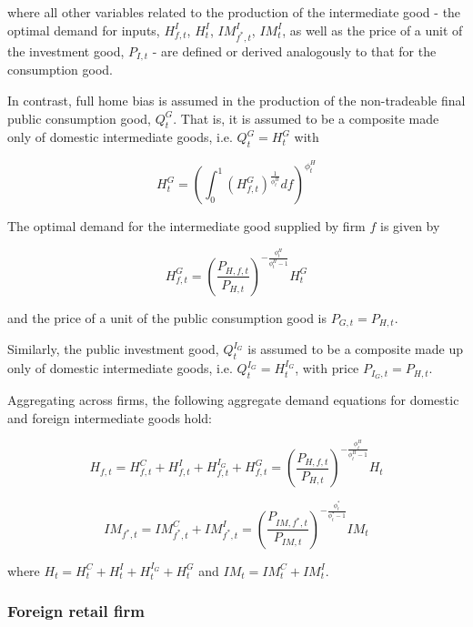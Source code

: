 \documentclass[a4paper,11pt]{article}
\numberwithin{equation}{section}
\begin{document}
	where all other variables related to the production of the intermediate good - the optimal demand for inputs, $H_{f,t}^I$, $H_t^I$, $IM_{f^*,t}^I$, $IM_t^I$, as well as the price of a unit of the investment good, $P_{I,t}$ - are defined or derived analogously to that for the consumption good.
	
	In contrast, full home bias is assumed in the production of the non-tradeable final public consumption good, $Q^G_t$. That is, it is assumed to be a	composite made only of domestic intermediate goods, i.e. $Q^G_t = H_t^G$ with
	
	\begin{equation}
	H_t^G=\left(\int_{0}^{1}\left(H_{f,t}^G\right)^{\frac{1}{\phi_t^H}}df\right)^{\phi_t^H}
	\end{equation}
	
	The optimal demand for the intermediate good supplied by firm $f$ is given by
	
	\begin{equation}
	H_{f,t}^G=\left(\frac{P_{H,f,t}}{P_{H,t}}\right)^{-\frac{\phi_t^H}{\phi_t^H-1}}H_t^G
	\end{equation}
	
	and the price of a unit of the public consumption good is $P_{G,t}=P_{H,t}$.
	
	Similarly, the public investment good, $Q_t^{I_G}$ is assumed to be a composite made up only of domestic intermediate goods, i.e. $Q^{I_G}_t = H_t^{I_G}$, with price $P_{I_G,t}=P_{H,t}$.
	
	Aggregating across firms, the following aggregate demand equations for domestic and foreign intermediate goods hold:
	
	\begin{equation}
	H_{f,t}=H_{f,t}^C+H_{f,t}^I+H_{f,t}^{I_G}+H_{f,t}^G=\left(\frac{P_{H,f,t}}{P_{H,t}}\right)^{-\frac{\phi_t^H}{\phi_t^H-1}}H_t
	\end{equation}
	
	\begin{equation}
	IM_{f^*,t}=IM_{f^*,t}^C+IM_{f^*,t}^I=\left(\frac{P_{IM,f^*,t}}{P_{IM,t}}\right)^{-\frac{\phi_t^*}{\phi_t^*-1}}IM_t
	\end{equation}
	
	where $H_t=H_t^C+H_t^I+H_t^{I_G}+H_t^G$ and $IM_t=IM_t^C+IM_t^I$.
	
	
	\subsubsection{Foreign retail firm}
	
\end{document}
